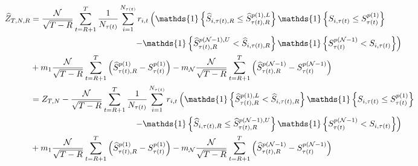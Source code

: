 \begin{align*}
    \widehat{Z}_{T,N,R} &=\frac{\mathcal{N}}{\sqrt{T-R}}\sum_{t=R+1}^{T}\frac{1}{N_{\tau(t)}}\sum_{i=1}^{N_{\tau(t)}}r_{i,t}\left( \mathds{1} \left\{ \widehat{S}_{i,\tau(t),R}\leq \widehat{S}_{\tau(t),R}^{p(1),L}\right\} \mathds{1} \left\{ S_{i,\tau(t)}\leq S_{\tau(t)}^{p(1)}\right\} \right. \\
    & \hspace{4.3cm} \left. -\mathds{1} \left\{ \widehat{S}_{\tau(t),R}^{p(\mathcal{N}-1),U} < \widehat{S}_{i,\tau(t),R}\right\} \mathds{1} \left\{ S_{\tau(t)}^{p(\mathcal{N}-1)} < S_{i,\tau(t)}\right\} \right) \\
    &+m_{1}\frac{\mathcal{N}}{\sqrt{T-R}}\sum_{t=R+1}^{T}\left( \widehat{S}_{\tau(t),R}^{p(1)}-S_{\tau(t)}^{p(1)}\right) -m_{\mathcal{N}}\frac{\mathcal{N}}{\sqrt{T-R}}\sum_{t=R+1}^{T}\left( \widehat{S}_{\tau(t),R}^{p(\mathcal{N}-1)}-S_{\tau(t)}^{p(\mathcal{N}-1)}\right) \\
    &=Z_{T,N} - \frac{\mathcal{N}}{\sqrt{T-R}}\sum_{t=R+1}^{T}\frac{1}{N_{\tau(t)}}\sum_{i=1}^{N_{\tau(t)}}r_{i,t}\left( \mathds{1} \left\{  \widehat{S}_{\tau(t),R}^{p(1),L} < \widehat{S}_{i,\tau(t),R} \right\} \mathds{1} \left\{ S_{i,\tau(t)}\leq S_{\tau(t)}^{p(1)}\right\} \right. \\
    & \hspace{4.3cm} \left. -\mathds{1} \left\{ \widehat{S}_{i,\tau(t),R} \leq \widehat{S}_{\tau(t),R}^{p(\mathcal{N}-1),U} \right\} \mathds{1} \left\{ S_{\tau(t)}^{p(\mathcal{N}-1)} < S_{i,\tau(t)} \right\} \right) \\
    &+m_{1}\frac{\mathcal{N}}{\sqrt{T-R}}\sum_{t=R+1}^{T}\left( \widehat{S}_{\tau(t),R}^{p(1)}-S_{\tau(t)}^{p(1)}\right) -m_{\mathcal{N}}\frac{\mathcal{N}}{\sqrt{T-R}}\sum_{t=R+1}^{T}\left( \widehat{S}_{\tau(t),R}^{p(\mathcal{N}-1)}-S_{\tau(t)}^{p(\mathcal{N}-1)}\right)
\end{align*}
